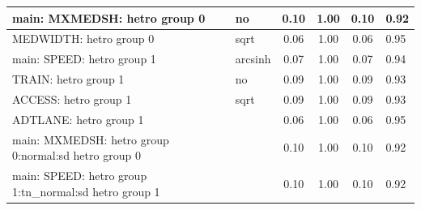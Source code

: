 \begin{table}
\begin{center}
\begin{tabular}{|l|l|c|c|c|l|}
			\hline
			main: MXMEDSH: hetro group 0 & no & 0.10 & 1.00 & 0.10 & 0.92 \\
			\hline
			MEDWIDTH: hetro group 0 & sqrt & 0.06 & 1.00 & 0.06 & 0.95 \\
			\hline
			main: SPEED: hetro group 1 & arcsinh & 0.07 & 1.00 & 0.07 & 0.94 \\
			\hline
			TRAIN: hetro group 1 & no & 0.09 & 1.00 & 0.09 & 0.93 \\
			\hline
			ACCESS: hetro group 1 & sqrt & 0.09 & 1.00 & 0.09 & 0.93 \\
			\hline
			ADTLANE: hetro group 1 &  & 0.06 & 1.00 & 0.06 & 0.95 \\
			\hline
			main: MXMEDSH: hetro group 0:normal:sd  hetro group 0 &  & 0.10 & 1.00 & 0.10 & 0.92 \\
			\hline
			main: SPEED: hetro group 1:tn_normal:sd  hetro group 1 &  & 0.10 & 1.00 & 0.10 & 0.92 \\
			\hline
		\end{tabular}
	\end{center}
\end{table}